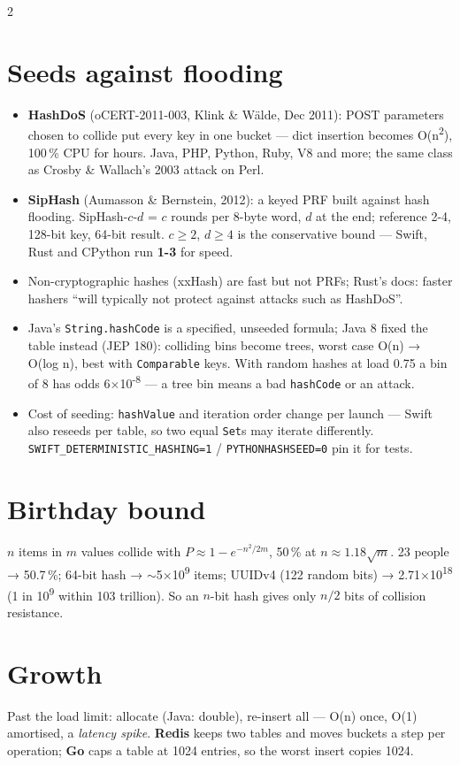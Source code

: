 \documentclass[8pt]{extarticle}
\newcommand\ct[1]{\texttt{#1}}
\begin{document}
\begin{multicols}{2}
\section{Seeds against flooding}
\begin{itemize}
  \item \textbf{HashDoS} (oCERT-2011-003, Klink \& Wälde, Dec 2011): POST parameters chosen to
        collide put every key in one bucket — dict insertion becomes O(n\textsuperscript{2}),
        100\,\% CPU for hours. Java, PHP, Python, Ruby, V8 and more; the same class as Crosby \&
        Wallach's 2003 attack on Perl.
  \item \textbf{SipHash} (Aumasson \& Bernstein, 2012): a keyed PRF built against hash flooding.
        SipHash-$c$-$d$ = $c$ rounds per 8-byte word, $d$ at the end; reference 2-4, 128-bit key,
        64-bit result. $c \ge 2$, $d \ge 4$ is the conservative bound — Swift, Rust and CPython
        run \textbf{1-3} for speed.
  \item Non-cryptographic hashes (xxHash) are fast but not PRFs; Rust's docs: faster hashers
        ``will typically not protect against attacks such as HashDoS''.
  \item Java's \ct{String.hashCode} is a specified, unseeded formula; Java 8 fixed the table
        instead (JEP 180): colliding bins become trees, worst case O(n) → O(log n), best with
        \ct{Comparable} keys. With random hashes at load 0.75 a bin of 8 has odds
        6$\times$10\textsuperscript{-8} — a tree bin means a bad \ct{hashCode} or an attack.
  \item Cost of seeding: \ct{hashValue} and iteration order change per launch — Swift also
        reseeds per table, so two equal \ct{Set}s may iterate differently.
        \ct{SWIFT\_DETERMINISTIC\_HASHING=1} / \ct{PYTHONHASHSEED=0} pin it for tests.
\end{itemize}

\section{Birthday bound}
$n$ items in $m$ values collide with $P \approx 1 - e^{-n^2/2m}$, 50\,\% at
$n \approx 1.18\sqrt{m}$. 23 people → 50.7\,\%; 64-bit hash → $\sim$5$\times$10\textsuperscript{9}
items; UUIDv4 (122 random bits) → 2.71$\times$10\textsuperscript{18} (1 in 10\textsuperscript{9}
within 103 trillion). So an $n$-bit hash gives only $n/2$ bits of collision resistance.

\section{Growth}
Past the load limit: allocate (Java: double), re-insert all — O(n) once, O(1) amortised, a
\emph{latency spike}. \textbf{Redis} keeps two tables and moves buckets a step per operation;
\textbf{Go} caps a table at 1024 entries, so the worst insert copies 1024.


\end{multicols}
\end{document}

